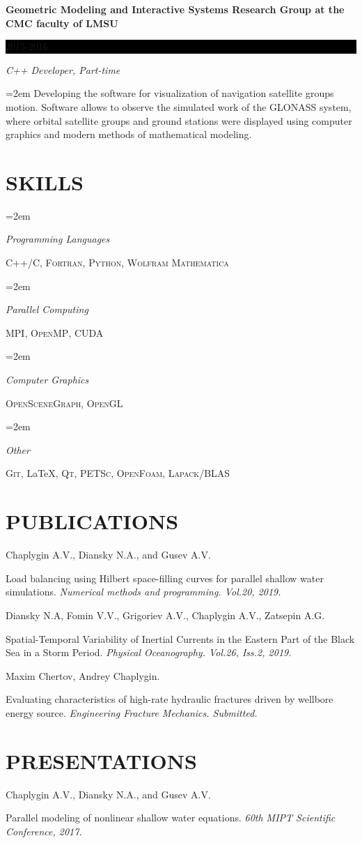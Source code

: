 \documentclass[paper=a4,fontsize=11pt]{scrartcl}
\newlength{\spacebox}
\newcommand{\sepspace}{\vspace*{1em}}		%
\newcommand{\NewPart}[1]{\section*{\uppercase{#1}}}
\newcommand{\PersonalEntry}[2]{
		\noindent\hangindent=2em\hangafter=0 %
		\parbox{\spacebox}{        %
		\textit{#1}}		       %
		\hspace{1.5em} #2 \par}    %
\newcommand{\SkillsEntry}[2]{      %
		\noindent\hangindent=2em\hangafter=0 %
		\parbox{\spacebox}{        %
		\textit{#1}}			   %
		\hspace{1.5em} #2 \par}    %
\newcommand{\EducationEntry}[4]{
		\noindent \textbf{#1} \hfill      %
		\colorbox{Black}{%
			\parbox{6em}{%
			\hfill\color{White}#2}} \par  %
		\noindent \textit{#3} \par        %
		\noindent\hangindent=2em\hangafter=0 \small #4 %
		\normalsize \par}
\begin{document}
\EducationEntry{Geometric Modeling and Interactive Systems Research Group at the CMC faculty of LMSU}{2015-2016}{C++ Developer, Part-time}
{Developing the software for visualization of navigation satellite groups motion.
Software allows to observe the simulated work of the GLONASS system, 
where orbital satellite groups and ground stations were displayed 
using computer graphics and modern methods of mathematical modeling.}

\NewPart{Skills}{}

\SkillsEntry{Programming Languages}{\textsc{C++/C}, \textsc{Fortran}, \textsc{Python}, \textsc{Wolfram Mathematica}}
\sepspace

\SkillsEntry{Parallel Computing}{\textsc{MPI}, \textsc{OpenMP}, \textsc{CUDA}}
\sepspace

\SkillsEntry{Computer Graphics}{\textsc{OpenSceneGraph}, \textsc{OpenGL}}
\sepspace

\SkillsEntry{Other}{\textsc{Git}, \LaTeX, \textsc{Qt}, \textsc{PETSc},  \textsc{OpenFoam}, \textsc{Lapack/BLAS}}

\NewPart{Publications}{}

Chaplygin A.V., Diansky N.A., and Gusev A.V. 

Load balancing using Hilbert space-filling curves for parallel shallow water simulations.
\textit{Numerical methods and programming. Vol.20, 2019.}
\sepspace

Diansky N.A, Fomin V.V., Grigoriev A.V., Chaplygin A.V., Zatsepin A.G.

Spatial-Temporal Variability of Inertial Currents
in the Eastern Part of the Black Sea in a Storm Period.
\textit{Physical Oceanography. Vol.26, Iss.2, 2019.}
\sepspace

Maxim Chertov, Andrey Chaplygin.

Evaluating characteristics of high-rate hydraulic fractures driven by wellbore energy source.
\textit{Engineering Fracture Mechanics. Submitted.}

\NewPart{Presentations}{} %

Chaplygin A.V., Diansky N.A., and Gusev A.V. 

Parallel modeling of nonlinear shallow water equations.
\textit{60th MIPT Scientific Conference, 2017.}
\sepspace
\end{document}
